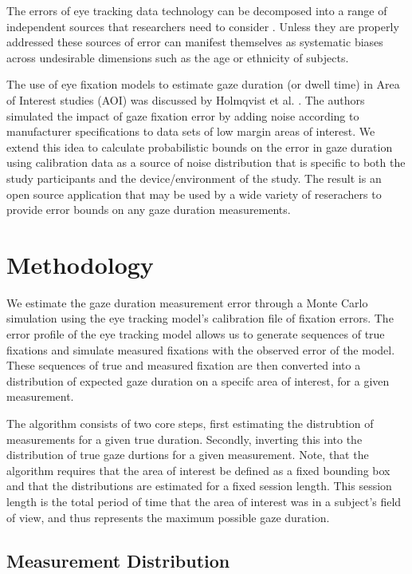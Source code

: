 \documentclass[12pt,a4paper]{article}
\numberwithin{equation}{section}
\begin{document}
The errors of eye tracking data technology can be decomposed into a range of
independent sources that researchers need to consider \cite{Holmqvist2012}.
Unless they are properly addressed these sources of error can manifest themselves
as systematic biases across undesirable dimensions such as the age\cite{Dalrymple2018}
or ethnicity of subjects\cite{Blignaut2013}. 

The use of eye fixation models to estimate gaze duration (or dwell time) in Area of
Interest studies (AOI) was discussed by Holmqvist et al. \cite{Holmqvist2012}. The
authors simulated the impact of gaze fixation error by adding noise according to
manufacturer specifications to data sets of low margin areas of interest. We extend 
this idea to calculate probabilistic bounds on the error in gaze duration using
calibration data as a source of noise distribution that is specific to both the
study participants and the device/environment of the study. The result is an open
source application that may be used by a wide variety of reserachers to provide
error bounds on any gaze duration measurements.


\section{Methodology}

We estimate the gaze duration measurement error through a Monte Carlo simulation
using the eye tracking model's calibration file of fixation errors.
The error profile of the eye tracking model allows us to generate sequences of true
fixations and simulate measured fixations with the observed error of the model.
These sequences of true and measured fixation are then converted into a distribution
of expected gaze duration on a specifc area of interest, for a given measurement. 

The algorithm consists of two core steps, first estimating the distrubtion of measurements
for a given true duration. Secondly, inverting this into the distribution of true
gaze durtions for a given measurement. Note, that the algorithm requires that the area of
interest be defined as a fixed bounding box and that the distributions are estimated for
a fixed session length. This session length is the total period of time that the area of
interest was in a subject's field of view, and thus represents the maximum possible gaze
duration.

\subsection{Measurement Distribution}
\end{document}
